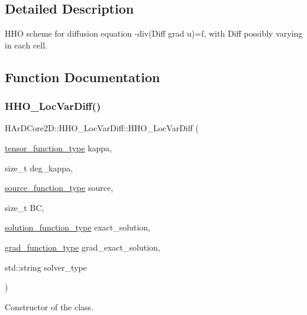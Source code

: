 \subsection{Detailed Description}
H\+HO scheme for diffusion equation -\/div(Diff grad u)=f, with Diff possibly varying in each cell. 



\subsection{Function Documentation}
\mbox{\label{group__HHO__LocVarDiff_ga5f2ab34d1e5afb3d83b548a1cb09f83a}} 
\subsubsection{\texorpdfstring{H\+H\+O\+\_\+\+Loc\+Var\+Diff()}{HHO\_LocVarDiff()}}
{\footnotesize\ttfamily H\+Ar\+D\+Core2\+D\+::\+H\+H\+O\+\_\+\+Loc\+Var\+Diff\+::\+H\+H\+O\+\_\+\+Loc\+Var\+Diff (\begin{DoxyParamCaption}\item[{\hyperlink{classHArDCore2D_1_1HHO__LocVarDiff_a15bd0c2320b456efcc07c11842c13492}{tensor\+\_\+function\+\_\+type}}]{kappa,  }\item[{size\+\_\+t}]{deg\+\_\+kappa,  }\item[{\hyperlink{classHArDCore2D_1_1HHO__LocVarDiff_a0bd07aa3ccc1aa9dd3c9573a5ab1c7dd}{source\+\_\+function\+\_\+type}}]{source,  }\item[{size\+\_\+t}]{BC,  }\item[{\hyperlink{classHArDCore2D_1_1HHO__LocVarDiff_a8bb87b6170b8a77e14d343bf76cac3d6}{solution\+\_\+function\+\_\+type}}]{exact\+\_\+solution,  }\item[{\hyperlink{classHArDCore2D_1_1HHO__LocVarDiff_a00b073818ecee542bb74860b1c204d49}{grad\+\_\+function\+\_\+type}}]{grad\+\_\+exact\+\_\+solution,  }\item[{std\+::string}]{solver\+\_\+type }\end{DoxyParamCaption})}



Constructor of the class. 


